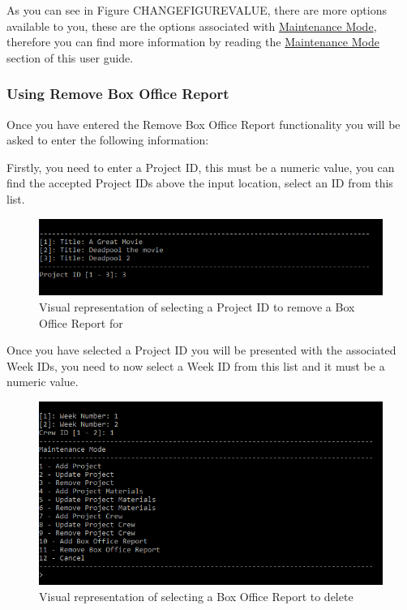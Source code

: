 \documentclass[
  english,
  a4paper,
,tablecaptionabove
]{scrartcl}
\begin{document}
As you can see in Figure CHANGEFIGUREVALUE, there are more options
available to you, these are the options associated with
\protect\hyperlink{using-maintenance-mode}{Maintenance Mode}, therefore
you can find more information by reading the
\protect\hyperlink{using-maintenance-mode}{Maintenance Mode} section of
this user guide.

\newpage

\hypertarget{using-remove-box-office-report}{%
\subsubsection{Using Remove Box Office
Report}\label{using-remove-box-office-report}}

Once you have entered the Remove Box Office Report functionality you
will be asked to enter the following information:

Firstly, you need to enter a Project ID, this must be a numeric value,
you can find the accepted Project IDs above the input location, select
an ID from this list.

\begin{figure}
\centering
\includegraphics{images/user-guide/maintenance-mode/remove-project-select-id.png}
\caption{Visual representation of selecting a Project ID to remove a Box
Office Report for}
\end{figure}

Once you have selected a Project ID you will be presented with the
associated Week IDs, you need to now select a Week ID from this list and
it must be a numeric value.

\begin{figure}
\centering
\includegraphics{images/user-guide/maintenance-mode/remove-box-office-select-id.png}
\caption{Visual representation of selecting a Box Office Report to
delete}
\end{figure}
\end{document}
